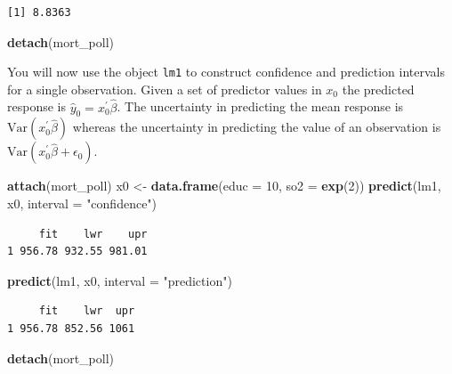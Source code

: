 \documentclass[
]{book}
\newenvironment{Shaded}{\begin{snugshade}}{\end{snugshade}}
\newcommand{\DataTypeTok}[1]{\textcolor[rgb]{0.13,0.29,0.53}{#1}}
\newcommand{\DecValTok}[1]{\textcolor[rgb]{0.00,0.00,0.81}{#1}}
\newcommand{\KeywordTok}[1]{\textcolor[rgb]{0.13,0.29,0.53}{\textbf{#1}}}
\newcommand{\NormalTok}[1]{#1}
\newcommand{\StringTok}[1]{\textcolor[rgb]{0.31,0.60,0.02}{#1}}
\begin{document}
\begin{verbatim}
[1] 8.8363
\end{verbatim}

\begin{Shaded}
\begin{Highlighting}[]
\KeywordTok{detach}\NormalTok{(mort_poll)}
\end{Highlighting}
\end{Shaded}

You will now use the object \texttt{lm1} to construct confidence and prediction intervals for a single observation. Given a set of predictor values in \(x_0\) the predicted response is \(\hat{y}_0 = x_0^{'}\hat{\beta}\). The uncertainty in predicting the mean response is \(\text{Var}(x_0^{'}\hat{\beta})\) whereas the uncertainty in predicting the value of an observation is \(\text{Var}(x_0^{'}\hat{\beta}+\epsilon_0)\).

\begin{Shaded}
\begin{Highlighting}[]
\KeywordTok{attach}\NormalTok{(mort_poll)}
\NormalTok{x0 <-}\StringTok{ }\KeywordTok{data.frame}\NormalTok{(}\DataTypeTok{educ =} \DecValTok{10}\NormalTok{, }\DataTypeTok{so2 =} \KeywordTok{exp}\NormalTok{(}\DecValTok{2}\NormalTok{))}
\KeywordTok{predict}\NormalTok{(lm1, x0, }\DataTypeTok{interval =} \StringTok{"confidence"}\NormalTok{)}
\end{Highlighting}
\end{Shaded}

\begin{verbatim}
     fit    lwr    upr
1 956.78 932.55 981.01
\end{verbatim}

\begin{Shaded}
\begin{Highlighting}[]
\KeywordTok{predict}\NormalTok{(lm1, x0, }\DataTypeTok{interval =} \StringTok{"prediction"}\NormalTok{)}
\end{Highlighting}
\end{Shaded}

\begin{verbatim}
     fit    lwr  upr
1 956.78 852.56 1061
\end{verbatim}

\begin{Shaded}
\begin{Highlighting}[]
\KeywordTok{detach}\NormalTok{(mort_poll)}
\end{Highlighting}
\end{Shaded}
\end{document}
